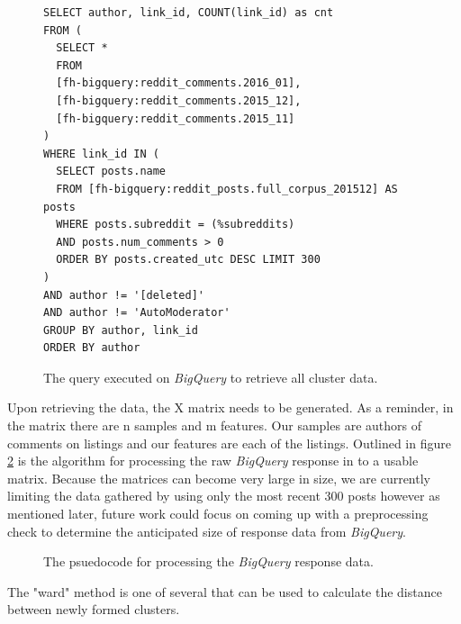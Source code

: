 \documentclass[msc,oneside]{ubcthesis}%
\begin{document}
\begin{figure}[!htb]
\begin{lstlisting}
SELECT author, link_id, COUNT(link_id) as cnt 
FROM ( 
  SELECT * 
  FROM 
  [fh-bigquery:reddit_comments.2016_01], 
  [fh-bigquery:reddit_comments.2015_12], 
  [fh-bigquery:reddit_comments.2015_11] 
)
WHERE link_id IN ( 
  SELECT posts.name 
  FROM [fh-bigquery:reddit_posts.full_corpus_201512] AS posts 
  WHERE posts.subreddit = (%subreddits) 
  AND posts.num_comments > 0 
  ORDER BY posts.created_utc DESC LIMIT 300 
) 
AND author != '[deleted]' 
AND author != 'AutoModerator' 
GROUP BY author, link_id 
ORDER BY author
\end{lstlisting}
\caption[BigQuery for retrieving clustering data]{
The query executed on \textit{BigQuery} to retrieve all cluster data.}
\label{fig:clusterquery}
\end{figure}

Upon retrieving the data, the X matrix needs to be generated. As a reminder, in the matrix there are n samples and m features. Our samples are authors of comments on listings and our features are each of the listings. Outlined in figure \ref{fig:clusteralgo} is the algorithm for processing the raw \textit{BigQuery} response in to a usable matrix. Because the matrices can become very large in size, we are currently limiting the data gathered by using only the most recent 300 posts however as mentioned later, future work could focus on coming up with a preprocessing check to determine the anticipated size of response data from \textit{BigQuery}.

\begin{figure}[!htb]
\begin{algorithm}[H]
	  \EndFor
\end{algorithm}
\caption[Psuedocode for processing BigQuery data]{
The psuedocode for processing the \textit{BigQuery} response data.}
\label{fig:clusteralgo}
\end{figure}

The "ward" method is one of several that can be used to calculate the distance between newly formed clusters.


\newpage %
\pagestyle{fancy}\rhead{}\cfoot{}\rfoot{\thepage}

\end{document}
